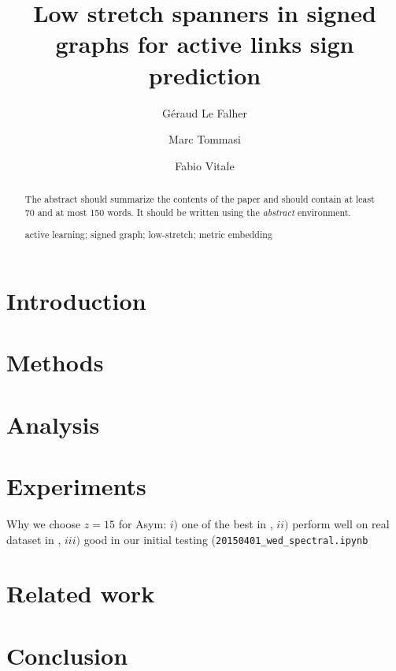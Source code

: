 \documentclass[runningheads,a4paper]{llncs}
\newcommand{\keywords}[1]{\par\addvspace\baselineskip
\noindent\keywordname\enspace\ignorespaces#1}
\begin{document}
\mainmatter
\title{Low stretch spanners in signed graphs for active links sign prediction}
\author{Géraud Le Falher \and Marc Tommasi \and Fabio Vitale}
\maketitle


\begin{abstract}
The abstract should summarize the contents of the paper and should
contain at least 70 and at most 150 words. It should be written using the
\emph{abstract} environment.
\keywords{active learning; signed graph; low-stretch; metric embedding}
\end{abstract}


\section{Introduction}

\section{Methods}

\section{Analysis}

\section{Experiments}

Why we choose $z=15$ for Asym: $i)$ one of the best in \cite[Fig.
11]{Kunegis2009}, $ii)$ perform well on real dataset in
\cite[Fig.3]{Cesa-Bianchi2012a}, $iii)$ good in our initial testing
(\texttt{20150401\_wed\_spectral.ipynb}

\section{Related work}

\section{Conclusion}



\end{document}
